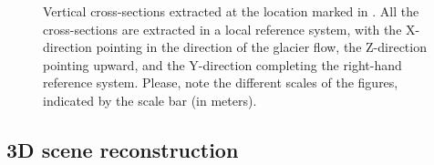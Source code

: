 \begin{figure}
\begin{center}
     \hspace{70mm} 
  \end{center}
  \caption{Vertical cross-sections extracted at the location marked in
    .
    All the cross-sections are extracted in a local reference system, with the
    X-direction pointing in the direction of the glacier flow, the Z-direction pointing upward, and the Y-direction completing the right-hand reference system.
    Please, note the different scales of the figures, indicated by the scale bar (in
    meters).}
  \label{fig:4:sections}
\end{figure}

\subsection{3D scene reconstruction}\label{sec:4:res_3dreconstruction_results}


